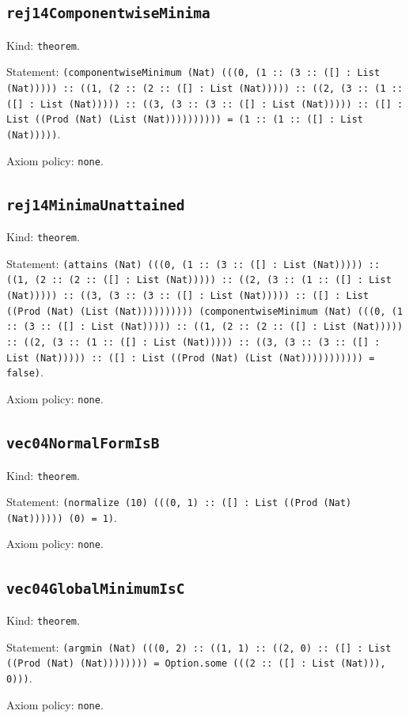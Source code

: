 \documentclass[11pt]{article}
\begin{document}
\subsection*{\texttt{rej14ComponentwiseMinima}}
\noindent Kind: \texttt{theorem}.\par
\noindent Statement: \texttt{(componentwiseMinimum (Nat) (((0, (1 :: (3 :: ([] : List (Nat))))) :: ((1, (2 :: (2 :: ([] : List (Nat))))) :: ((2, (3 :: (1 :: ([] : List (Nat))))) :: ((3, (3 :: (3 :: ([] : List (Nat))))) :: ([] : List ((Prod (Nat) (List (Nat)))))))))) = (1 :: (1 :: ([] : List (Nat)))))}.\par
\noindent Axiom policy: \texttt{none}.\par
\subsection*{\texttt{rej14MinimaUnattained}}
\noindent Kind: \texttt{theorem}.\par
\noindent Statement: \texttt{(attains (Nat) (((0, (1 :: (3 :: ([] : List (Nat))))) :: ((1, (2 :: (2 :: ([] : List (Nat))))) :: ((2, (3 :: (1 :: ([] : List (Nat))))) :: ((3, (3 :: (3 :: ([] : List (Nat))))) :: ([] : List ((Prod (Nat) (List (Nat)))))))))) (componentwiseMinimum (Nat) (((0, (1 :: (3 :: ([] : List (Nat))))) :: ((1, (2 :: (2 :: ([] : List (Nat))))) :: ((2, (3 :: (1 :: ([] : List (Nat))))) :: ((3, (3 :: (3 :: ([] : List (Nat))))) :: ([] : List ((Prod (Nat) (List (Nat))))))))))) = false)}.\par
\noindent Axiom policy: \texttt{none}.\par
\subsection*{\texttt{vec04NormalFormIsB}}
\noindent Kind: \texttt{theorem}.\par
\noindent Statement: \texttt{(normalize (10) (((0, 1) :: ([] : List ((Prod (Nat) (Nat)))))) (0) = 1)}.\par
\noindent Axiom policy: \texttt{none}.\par
\subsection*{\texttt{vec04GlobalMinimumIsC}}
\noindent Kind: \texttt{theorem}.\par
\noindent Statement: \texttt{(argmin (Nat) (((0, 2) :: ((1, 1) :: ((2, 0) :: ([] : List ((Prod (Nat) (Nat)))))))) = Option.some (((2 :: ([] : List (Nat))), 0)))}.\par
\noindent Axiom policy: \texttt{none}.\par
\end{document}
